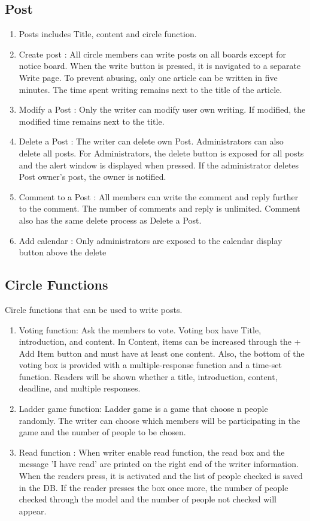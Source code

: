 \documentclass[conference]{IEEEtran}
\begin{document}
\subsection{Post}
\begin{enumerate}
    \item Posts includes Title, content and circle function. 
    \item Create post : All circle members can write posts on all boards except for notice board. When the write button is pressed, it is navigated to a separate Write page. To prevent abusing, only one article can be written in five minutes. The time spent writing remains next to the title of the article.
    \item Modify a Post : Only the writer can modify user own writing. If modified, the modified time remains next to the title.
    \item Delete a Post : The writer can delete own Post. Administrators can also delete all posts. For Administrators, the delete button is exposed for all posts and the alert window is displayed when pressed. If the administrator deletes Post owner's post, the owner is notified.
    \item Comment to a Post : All members can write the comment and reply further to the comment. The number of comments and reply is unlimited. Comment also has the same delete process as Delete a Post.
    \item Add calendar : Only administrators are exposed to the calendar display button above the delete
\end{enumerate}
\subsection{Circle Functions}
Circle functions that can be used to write posts.
\begin{enumerate}
    \item Voting function: Ask the members to vote. Voting box have Title, introduction, and content. In Content, items can be increased through the + Add Item button and must have at least one content. Also, the bottom of the voting box is provided with a multiple-response function and a time-set function. Readers will be shown whether a title, introduction, content, deadline, and multiple responses. 
    \item Ladder game function: Ladder game is a game that choose n people randomly. The writer can choose which members will be participating in the game and the number of people to be chosen.
    \item Read function : When writer enable read function, the read box and the message 'I have read' are printed on the right end of the writer information. When the readers press, it is activated and the list of people checked is saved in the DB. If the reader presses the box once more, the number of people checked through the model and the number of people not checked will appear.
\end{enumerate}
\end{document}
